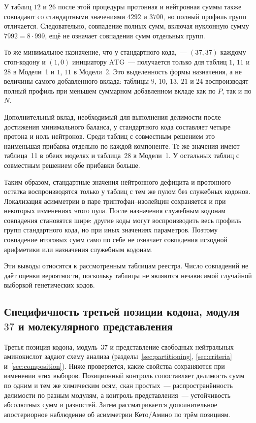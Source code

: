 \documentclass[11pt,a4paper]{article}
\renewcommand{\_}{\origunderscore\allowbreak}
\begin{document}
У таблиц $12$ и $26$ после этой процедуры протонная
и нейтронная суммы также совпадают со стандартными
значениями $4292$ и $3700$, но полный профиль групп
отличается. Следовательно, совпадение полных сумм,
включая нуклонную сумму $7992=8\cdot999$, ещё
не означает совпадения сумм отдельных групп.

То же минимальное назначение, что у стандартного
кода,~--- $(37,37)$ каждому стоп-кодону и $(1,0)$
инициатору $\mathrm{ATG}$~--- получается только
для таблиц $1$, $11$ и $28$ в Модели~1 и
$1$, $11$ в Модели~2. Это выделенность формы
назначения, а не величины самого добавленного
вклада: таблицы $9$, $10$, $13$, $21$ и $24$
воспроизводят полный профиль при меньшем суммарном
добавленном вкладе как по $P$, так и по $N$.

Дополнительный вклад, необходимый для выполнения
делимости после достижения минимального баланса,
у стандартного кода составляет четыре протона
и ноль нейтронов. Среди таблиц с совместным решением
это наименьшая прибавка отдельно по каждой компоненте.
Те же значения имеют таблица~11 в обеих моделях
и таблица~28 в Модели~1. У остальных таблиц
с совместным решением обе прибавки больше.

Таким образом, стандартные значения нейтронного
дефицита и протонного остатка воспроизводятся
только у таблиц с тем же пулом без служебных кодонов.
Локализация асимметрии в паре триптофан--изолейцин
сохраняется и при некоторых изменениях этого пула.
После назначения служебным кодонам совпадения
становятся шире: другие коды могут воспроизводить
весь профиль групп стандартного кода, но при иных
значениях параметров. Поэтому совпадение итоговых
сумм само по себе не означает совпадения исходной
арифметики или назначения служебным кодонам.

Эти выводы относятся к рассмотренным таблицам
реестра. Число совпадений не даёт оценки вероятности,
поскольку таблицы не являются независимой случайной
выборкой генетических кодов.

\subsection{Специфичность третьей позиции кодона, модуля~\texorpdfstring{$37$}{37} и молекулярного представления}
\label{sec:discussion-controls}

Третья позиция кодона, модуль~$37$ и представление свободных
нейтральных аминокислот задают схему анализа
(разделы~\ref{sec:partitioning}, \ref{sec:criteria}
и~\ref{sec:composition}). Ниже проверяется, какие свойства
сохраняются при изменении этих выборов. Позиционный контроль
сопоставляет делимость сумм по одним и тем же химическим осям,
скан простых~--- распространённость делимости по разным модулям,
а контроль представления~--- устойчивость абсолютных сумм
и разностей. Затем рассматривается дополнительное
апостериорное наблюдение об асимметрии Кето/Амино
по трём позициям.
\end{document}
